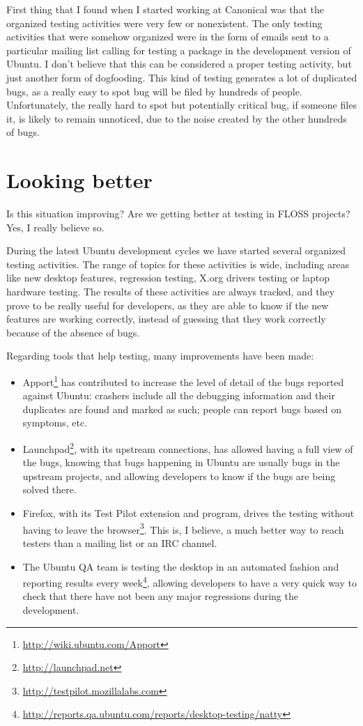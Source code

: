 First thing that I found when I started working at Canonical was that the
organized testing activities were very few or nonexistent. The only testing
activities that were somehow organized were in the form of emails sent to a
particular mailing list calling for testing a package in the development version
of Ubuntu. I don't believe that this can be considered a proper testing
activity, but just another form of dogfooding. This kind of testing generates a
lot of duplicated bugs, as a really easy to spot bug will be filed by hundreds
of people. Unfortunately, the really hard to spot but potentially critical bug,
if someone files it, is likely to remain unnoticed, due to the noise created by
the other hundreds of bugs.

\section*{Looking better}

Is this situation improving? Are we getting better at testing in FLOSS projects?
Yes, I really believe so.

During the latest Ubuntu development cycles we have started several organized
testing activities. The range of topics for these activities is wide, including
areas like new desktop features, regression testing, X.org drivers testing or
laptop hardware testing. The results of these activities are always tracked, and
they prove to be really useful for developers, as they are able to know if the
new features are working correctly, instead of guessing that they work correctly
because of the absence of bugs.

Regarding tools that help testing, many improvements have been made:
\begin{itemize}
 \item Apport\footnote{\url{http://wiki.ubuntu.com/Apport}} has contributed to
increase the level of detail of the bugs reported against Ubuntu: crashers
include all the debugging information and their duplicates are found and marked
as such; people can report bugs based on symptoms, etc.
 \item Launchpad\footnote{\url{http://launchpad.net}}, with its upstream
connections, has allowed having a full view of the bugs, knowing that bugs
happening in Ubuntu are usually bugs in the upstream projects, and allowing
developers to know if the bugs are being solved there. 
 \item Firefox, with its Test Pilot extension and program, drives the testing
without having to leave the
browser\footnote{\url{http://testpilot.mozillalabs.com}}. This is, I believe, a
much better way to reach testers than a mailing list or an IRC channel.
 \item The Ubuntu QA team is testing the desktop in an automated fashion and
reporting results every
week\footnote{\url{http://reports.qa.ubuntu.com/reports/desktop-testing/natty}},
allowing developers to have a very quick way to check that there have not been
any major regressions during the development.
\end{itemize}

